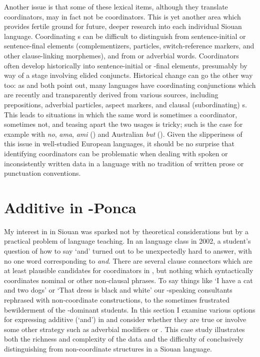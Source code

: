 \documentclass[output=paper]{LSP/langsci}
\begin{document}
Another issue is that some of these lexical items, although they translate  coordinators, may in fact not be coordinators. This is yet another area which provides fertile ground for future, deeper research into each individual Siouan language. Coordinating s can be difficult to distinguish from sentence-initial or sentence-final elements (complementizers,  particles, switch-reference markers, and other clause-linking morphemes), and from  or adverbial words. Coordinators often develop historically into sentence-initial or -final elements, presumably by way of a stage involving elided conjuncts. Historical change can go the other way too: as \citet{Mithun1988} and \citet{Stassen2000} both point out, many languages have coordinating conjunctions which are recently and transparently derived from various sources, including  prepositions, adverbial particles, aspect markers, and clausal (subordinating) s. This leads to situations in which the same word is sometimes a coordinator, sometimes not, and teasing apart the two usages is tricky; such is the case for example with  \textit{no}, \textit{ama}, \textit{ami} (\citealt{Fielder2008}) and Australian  \textit{but} (\citealt{MulderThompson2008}). Given the slipperiness of this issue in well-studied European languages, it should be no surprise that identifying coordinators can be problematic when dealing with spoken or inconsistently written data in a language with no tradition of written prose or punctuation conventions.

\section{Additive  in -Ponca}\label{sec:rudin:3}


\largerpage[-1]
My interest in  in Siouan was sparked not by theoretical considerations but by a practical problem of language teaching. In an  language class in 2002, a student's question of how to say `and' turned out to be unexpectedly hard to answer, with no one word corresponding to  \textit{and}. There are several clause connectors which are at least plausible candidates for coordinators in , but nothing which syntactically coordinates nominal or other non-clausal phrases. To say things like `I have a cat and two dogs' or `That dress is black and white' our -speaking consultants rephrased with non-coordinate constructions, to the sometimes frustrated bewilderment of the -dominant students.  In this section I examine various options for expressing additive  (`and') in  and consider whether they are true  or involve some other strategy such as adverbial modifiers or . This case study illustrates both the richness and complexity of the data and the difficulty of conclusively distinguishing  from non-coordinate structures in a Siouan language.
\end{document}
